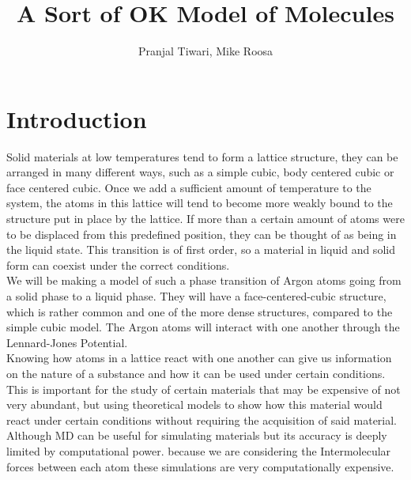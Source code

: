 \documentclass[11pt,twocolumn]{article}
\title{A Sort of OK Model of Molecules}
\author{Pranjal Tiwari, Mike Roosa}
\begin{document}

\section{Introduction}
Solid materials at low temperatures tend to form a lattice structure, they can be arranged in many different ways, such as a simple cubic, body centered cubic or face centered cubic. Once we add a sufficient amount of temperature to the system, the atoms in this lattice will tend to become more weakly bound to the structure put in place by the lattice. If more than a certain amount of atoms were to be displaced from this predefined position, they can be thought of as being in the liquid state. This transition is of first order, so a material in liquid and solid form can coexist under the correct conditions.\\
We will be making a model of such a phase transition of Argon atoms going from a solid phase to a liquid phase. They will have a face-centered-cubic structure, which is rather common and one of the more dense structures, compared to the simple cubic model. The Argon atoms will interact with one another through the Lennard-Jones Potential.\\
Knowing how atoms in a lattice react with one another can give us information on the nature of a substance and how it can be used under certain conditions. This is important for the study of certain materials that may be expensive of not very abundant, but using theoretical models to show how this material would react under certain conditions without requiring the acquisition of said material.\\
Although MD can be useful for simulating materials but its accuracy is deeply limited by computational power. because we are considering the Intermolecular forces between each atom these simulations are very computationally expensive. 
\end{document}
